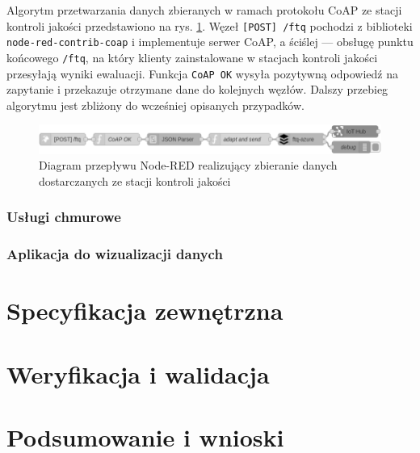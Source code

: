 \documentclass[a4paper, 12pt, twoside]{article}
\begin{document}
Algorytm przetwarzania danych zbieranych w ramach protokołu CoAP ze stacji
kontroli jakości przedstawiono na rys. \ref{fig:flow2}. Węzeł \texttt{[POST] /ftq}
pochodzi z biblioteki \texttt{node-red-contrib-coap} i implementuje serwer CoAP, 
a ściślej --- obsługę punktu końcowego \texttt{/ftq}, na który klienty zainstalowane
w stacjach kontroli jakości przesyłają wyniki ewaluacji. Funkcja \texttt{CoAP OK}
wysyła pozytywną odpowiedź na zapytanie i przekazuje otrzymane dane do kolejnych węzłów.
Dalszy przebieg algorytmu jest zbliżony do wcześniej opisanych przypadków. 

\begin{figure}[h]
      \centering
      \includegraphics[width=\textwidth]{flow2.png}
      \caption{Diagram przepływu Node-RED realizujący zbieranie danych dostarczanych ze stacji kontroli jakości}
      \label{fig:flow2}
\end{figure}



\subsubsection{Usługi chmurowe}

\subsubsection{Aplikacja do wizualizacji danych}


\section{Specyfikacja zewnętrzna}\label{spec-wew}

\section{Weryfikacja i walidacja}\label{testy}

\section{Podsumowanie i wnioski}\label{wnioski}

\printbibliography
\end{document}
